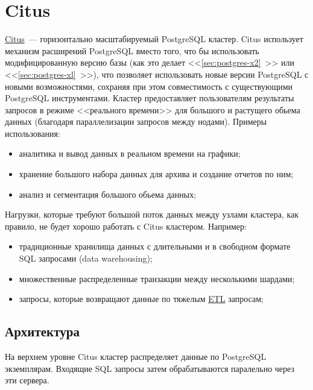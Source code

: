 \section{Citus}
\label{sec:citus}

\href{https://www.citusdata.com/}{Citus}~--- горизонтально масштабируемый PostgreSQL кластер. Citus использует механизм расширений PostgreSQL вместо того, что бы использовать модифицированную версию базы (как это делает <<\ref{sec:postgres-x2}~>> или <<\ref{sec:postgres-xl}~>>), что позволяет использовать новые версии PostgreSQL с новыми возможностями, сохраняя при этом совместимость с существующими PostgreSQL инструментами. Кластер предоставляет пользователям результаты запросов в режиме <<реального времени>> для большого и растущего обьема данных (благодаря параллелизации запросов между нодами). Примеры использования:

\begin{itemize}
  \item аналитика и вывод данных в реальном времени на графики;
  \item хранение большого набора данных для архива и создание отчетов по ним;
  \item анализ и сегментация большого обьема данных;
\end{itemize}

Нагрузки, которые требуют большой поток данных между узлами кластера, как правило, не будет хорошо работать с Citus кластером. Например:

\begin{itemize}
  \item традиционные хранилища данных с длительными и в свободном формате SQL запросами (data warehousing);
  \item множественные распределенные транзакции между несколькими шардами;
  \item запросы, которые возвращают данные по тяжелым \href{https://ru.wikipedia.org/wiki/ETL}{ETL} запросам;
\end{itemize}



\subsection{Архитектура}

На верхнем уровне Citus кластер распределяет данные по PostgreSQL экземплярам. Входящие SQL запросы затем обрабатываются паралельно через эти сервера.


